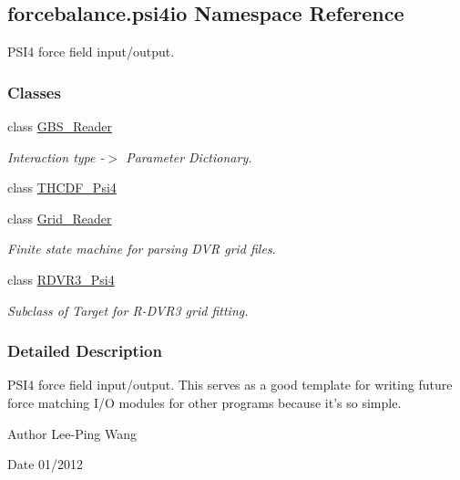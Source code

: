 \hypertarget{namespaceforcebalance_1_1psi4io}{\subsection{forcebalance.\-psi4io Namespace Reference}
\label{namespaceforcebalance_1_1psi4io}
}


P\-S\-I4 force field input/output.  


\subsubsection*{Classes}
\begin{DoxyCompactItemize}
\item 
class \hyperlink{classforcebalance_1_1psi4io_1_1GBS__Reader}{G\-B\-S\-\_\-\-Reader}
\begin{DoxyCompactList}\small\item\em Interaction type -\/$>$ Parameter Dictionary. \end{DoxyCompactList}\item 
class \hyperlink{classforcebalance_1_1psi4io_1_1THCDF__Psi4}{T\-H\-C\-D\-F\-\_\-\-Psi4}
\item 
class \hyperlink{classforcebalance_1_1psi4io_1_1Grid__Reader}{Grid\-\_\-\-Reader}
\begin{DoxyCompactList}\small\item\em Finite state machine for parsing D\-V\-R grid files. \end{DoxyCompactList}\item 
class \hyperlink{classforcebalance_1_1psi4io_1_1RDVR3__Psi4}{R\-D\-V\-R3\-\_\-\-Psi4}
\begin{DoxyCompactList}\small\item\em Subclass of Target for R-\/\-D\-V\-R3 grid fitting. \end{DoxyCompactList}\end{DoxyCompactItemize}


\subsubsection{Detailed Description}
P\-S\-I4 force field input/output. This serves as a good template for writing future force matching I/\-O modules for other programs because it's so simple.

\begin{DoxyAuthor}{Author}
Lee-\/\-Ping Wang 
\end{DoxyAuthor}
\begin{DoxyDate}{Date}
01/2012 
\end{DoxyDate}
